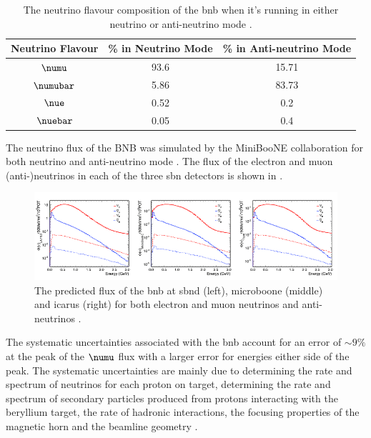 \begin{table}[h]
\begin{tabular}{ccc}
Neutrino Flavour & \% in Neutrino Mode & \% in Anti-neutrino Mode \\ \hline
$\numu$        & 93.6                & 15.71                    \\
$\numubar$  & 5.86                & 83.73                    \\
$\nue$          & 0.52                & 0.2                      \\
$\nuebar$    & 0.05                & 0.4                     
\end{tabular}
\caption[BNB flavour composition.]{The neutrino flavour composition of the \gls{bnb} when it's running in either neutrino or anti-neutrino mode \cite{BNB_flux}.}
\label{Table: BNB composition}
\end{table}

 The neutrino flux of the BNB was simulated by the MiniBooNE collaboration for both neutrino and anti-neutrino mode \cite{BNB_flux}. The flux of the electron and muon (anti-)neutrinos in each of the three \gls{sbn} detectors is shown in .
 \begin{figure}[h!]
     \centering
     \includegraphics[width = \textwidth]{figures-chap3/SBN_flux.png}
     \caption[Neutrino fluxes in SBN.]{The predicted flux of the \gls{bnb} at \gls{sbnd} (left), \gls{microboone} (middle) and \gls{icarus} (right) for both electron and muon neutrinos and anti-neutrinos \cite{SBN_Proposal}.}
     \label{fig: SBN flux}
\end{figure}
The systematic uncertainties associated with the \gls{bnb} account for an error of $\sim 9\%$ at the peak of the $\numu$ flux with a larger error for energies either side of the peak. The systematic uncertainties are mainly due to determining the rate and spectrum of neutrinos for each proton on target, determining the rate and spectrum of secondary particles produced from protons interacting with the beryllium target, the rate of hadronic interactions, the focusing properties of the magnetic horn and the beamline geometry \cite{BNB_flux}. 

